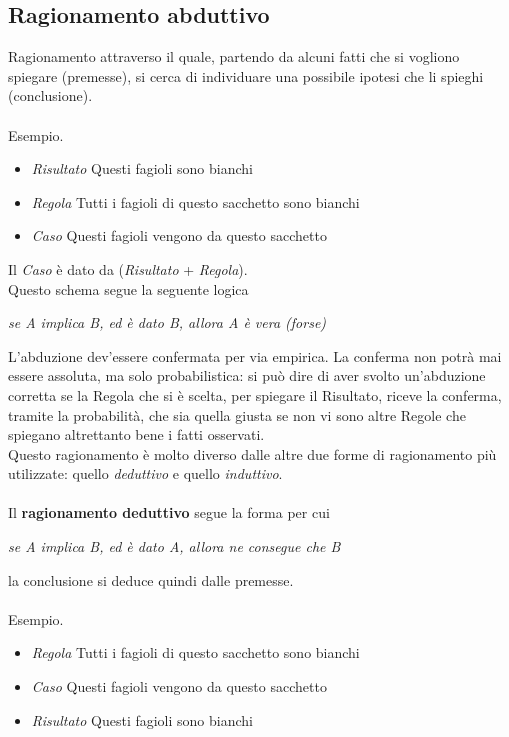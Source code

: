 \documentclass[a4paper,12pt]{report}
\begin{document}
\subsection{Ragionamento abduttivo}
Ragionamento attraverso il quale, partendo da alcuni fatti che si vogliono spiegare (premesse), si cerca
di individuare una possibile ipotesi che li spieghi (conclusione).\\ \\
Esempio.
\begin{itemize}
    \item \textit{Risultato} Questi fagioli sono bianchi
    \item \textit{Regola} Tutti i fagioli di questo sacchetto sono bianchi
    \item \textit{Caso} Questi fagioli vengono da questo sacchetto
\end{itemize}
Il \textit{Caso} è dato da (\textit{Risultato} + \textit{Regola}).\\
Questo schema segue la seguente logica
\begin{center}
    \textit{se A implica B, ed è dato B, allora A è vera (forse)}
\end{center}
L'abduzione dev'essere confermata per via empirica. La conferma non potrà mai essere assoluta, ma solo probabilistica: si può dire di aver svolto un'abduzione corretta se la Regola che si è scelta, per spiegare il Risultato, riceve la conferma, tramite la probabilità, che sia quella giusta se non vi sono altre Regole che spiegano altrettanto bene i fatti osservati.\\
Questo ragionamento è molto diverso dalle altre due forme di ragionamento più utilizzate: quello \textit{deduttivo} e quello \textit{induttivo}.\\
\\Il \textbf{ragionamento deduttivo} segue la forma per cui 
\begin{center}
    \textit{se A implica B, ed è dato A, allora ne consegue che B}
\end{center}
la conclusione si deduce quindi dalle premesse.\\ \\
Esempio.
\begin{itemize}
    \item \textit{Regola} Tutti i fagioli di questo sacchetto sono bianchi
    \item \textit{Caso} Questi fagioli vengono da questo sacchetto
    \item \textit{Risultato} Questi fagioli sono bianchi
\end{itemize}
\end{document}
